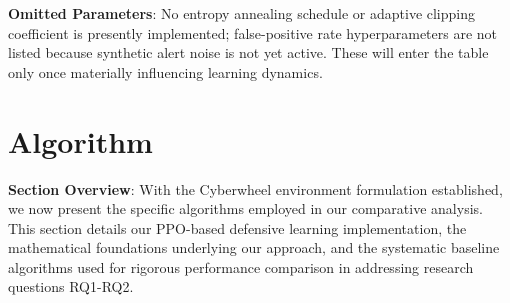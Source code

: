 \documentclass[12pt,twoside]{article}
\theoremstyle{definition}
\theoremstyle{plain}
\begin{document}
	\textbf{Omitted Parameters}: No entropy annealing schedule or adaptive clipping coefficient is presently implemented; false-positive rate hyperparameters are not listed because synthetic alert noise is not yet active. These will enter the table only once materially influencing learning dynamics.

\section{Algorithm}

\textbf{Section Overview}: With the Cyberwheel environment formulation established, we now present the specific algorithms employed in our comparative analysis. This section details our PPO-based defensive learning implementation, the mathematical foundations underlying our approach, and the systematic baseline algorithms used for rigorous performance comparison in addressing research questions RQ1-RQ2.
\end{document}
